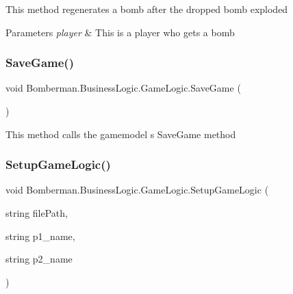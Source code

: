 This method regenerates a bomb after the dropped bomb exploded 


\begin{DoxyParams}{Parameters}
{\em player} & This is a player who gets a bomb\\
\hline
\end{DoxyParams}
\mbox{\label{class_bomberman_1_1_business_logic_1_1_game_logic_a8b8614ef81f7bf80f46384cc1f440ded}} 
\subsubsection{\texorpdfstring{SaveGame()}{SaveGame()}}
{\footnotesize\ttfamily void Bomberman.\+Business\+Logic.\+Game\+Logic.\+Save\+Game (\begin{DoxyParamCaption}{ }\end{DoxyParamCaption})\hspace{0.3cm}{\ttfamily [inline]}}



This method calls the gamemodel s Save\+Game method 

\mbox{\label{class_bomberman_1_1_business_logic_1_1_game_logic_a1f2f37aca7ccda0825d68f75bbf5fb3d}} 
\subsubsection{\texorpdfstring{SetupGameLogic()}{SetupGameLogic()}}
{\footnotesize\ttfamily void Bomberman.\+Business\+Logic.\+Game\+Logic.\+Setup\+Game\+Logic (\begin{DoxyParamCaption}\item[{string}]{file\+Path,  }\item[{string}]{p1\+\_\+name,  }\item[{string}]{p2\+\_\+name }\end{DoxyParamCaption})\hspace{0.3cm}{\ttfamily [inline]}}



